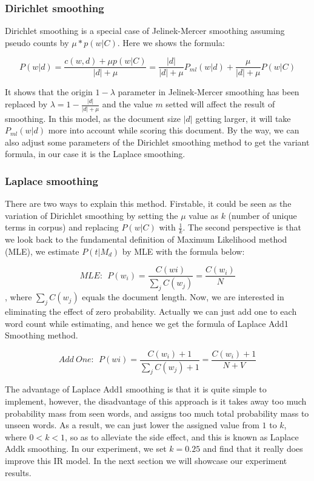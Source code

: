\documentclass{article}
\begin{document}
\subsubsection{Dirichlet smoothing}
Dirichlet smoothing is a special case of Jelinek-Mercer smoothing assuming pseudo counts by $\mu * p(w|C)$. Here we shows the formula:

$$P(w|d) = \frac{c(w,d) + \mu p(w|C)}{\left|d\right| + \mu} = \frac{\left|d\right|}{\left|d\right| + \mu}  P_{ml}(w|d) + \frac{\mu}{\left|d\right| + \mu}  P(w|C)$$

It shows that the origin $1-\lambda$ parameter in Jelinek-Mercer smoothing has been replaced by $\lambda = 1 - \frac{\left|d\right|}{\left|d\right| + \mu}$
and the value $m$ setted will affect the result of smoothing. In this model,
as the document size $\left| d \right|$ getting larger, it will take $P_{ml}(w|d)$ more into account while scoring this document. By the way, we can also adjust some parameters of the Dirichlet smoothing method to get the variant formula, in our case it is the Laplace smoothing.

\subsubsection{Laplace smoothing}
There are two ways to explain this method. Firstable, it could be seen as the variation of Dirichlet smoothing by setting the $\mu$ value as $k$ (number of unique terms in corpus) and replacing $P(w|C)$ with $\frac{1}{k}$. The second perspective is that we look back to the fundamental definition of Maximum Likelihood method (MLE), we estimate $P(t|M_d)$ by MLE with the formula below:

$$MLE:\ \ P(w_i) = \frac{C(wi)}{\sum_j{C(w_j)}} = \frac{C(w_i)}{N}$$, where $\sum_j{C(w_j)}$ equals the document length. Now, we are interested in eliminating the effect of zero probability. Actually we can just add one to each word count while estimating, and hence we get the formula of Laplace Add1 Smoothing method.

$$Add \ One: \ \ P(wi) = \frac{C(w_i) + 1}{\sum_j{C(w_j) + 1}} = \frac{C(w_i) + 1}{N + V}$$

The advantage of Laplace Add1 smoothing is that it is quite simple to implement, however,
the disadvantage of this approach is it takes away too much probability mass from seen
words, and assigns too much total probability mass to unseen words. As a result, we can
just lower the assigned value from $1$ to $k$, where $0 < k < 1$, so as to alleviate the side effect, and this is known as Laplace Addk smoothing. In our experiment, we set $k = 0.25$ and find that it really does improve this IR model. In the next section we will showcase our experiment results.
\end{document}
